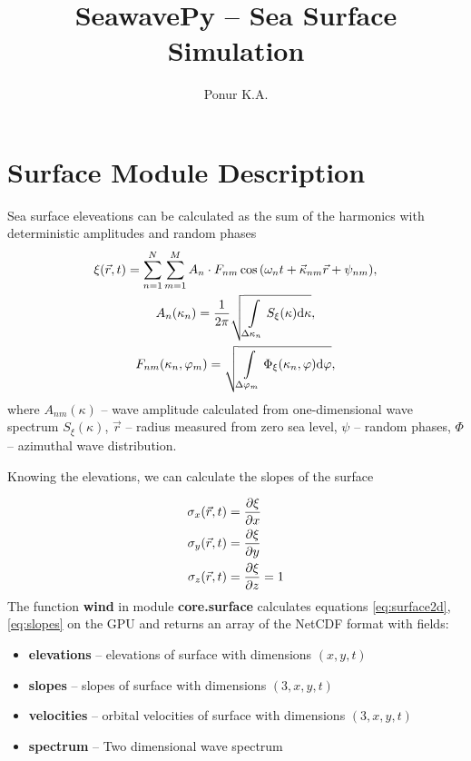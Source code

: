

%

\setcounter{secnumdepth}{0}
\title{SeawavePy -- Sea Surface Simulation}
\author{Ponur K.A.}


\newcommand{\python}{\textbf}

\maketitle

\section{Surface Module Description}
Sea surface eleveations can be calculated as the sum of the harmonics with
deterministic amplitudes and random phases
\begin{gather}
    \label{eq:surface2d}
    \xi(\vec r,t) = \sum\limits_{n=1}^{N} \sum\limits_{m=1}^{M}
    A_{n} \cdot
    F_{nm} \cos \qty(\omega_n t + \vec \kappa_{nm} \vec r + \psi_{nm}), \\
    A_n(\kappa_n) = \frac{1}{2 \pi} \sqrt{\int\limits_{\Delta \kappa_n} 
        S_\xi(\kappa)
    \dd \kappa}, \\
    F_{nm}(\kappa_n,\varphi_m) = \sqrt{\int\limits_{\Delta \varphi_m}
    \Phi_{\xi }(\kappa_n,\varphi) \dd \varphi},
\end{gather}
where $A_{nm}(\kappa)$ -- wave amplitude calculated from one-dimensional
wave spectrum $S_\xi(\kappa)$,  $\vec r$ --
radius measured from zero sea level,  $\psi$ -- random phases,  $\Phi$ -- azimuthal wave distribution.

Knowing the elevations, we can calculate the slopes  of the surface


\begin{equation}
    \label{eq:slopes}
    \begin{aligned}
        \sigma_x(\vec r,t) & = \pdv{\xi}{x} \\
        \sigma_y(\vec r,t) & = \pdv{\xi}{y} \\
        \sigma_z(\vec r,t) & = \pdv{\xi}{z} =  1 
    \end{aligned}
\end{equation}
The function \python{wind} in module \python{core.surface} calculates equations \eqref{eq:surface2d},
\eqref{eq:slopes} on the GPU and returns an array of the NetCDF format
with fields:
\begin{itemize}
    \item \python{elevations} -- elevations of surface with dimensions
        $(x,y,t)$
    \item \python{slopes} -- slopes of surface with dimensions
        $(3, x,y,t)$
    \item \python{velocities}
    -- orbital velocities of surface with dimensions
        $(3, x,y,t)$
    \item \python{spectrum} -- Two dimensional wave spectrum
\end{itemize}

